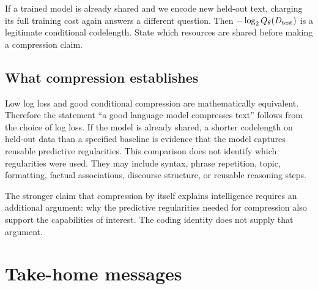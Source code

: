 \documentclass[11pt,twoside]{article}
\theoremstyle{definition}
\theoremstyle{remark}
\begin{document}
If a trained model is already shared and we encode new held-out text, charging
its full training cost again answers a different question. Then
$-\log_2Q_\theta(D_{\rm test})$ is a legitimate conditional codelength. State
which resources are shared before making a compression claim.

\subsection{What compression establishes}

Low log loss and good conditional compression are mathematically equivalent.
Therefore the statement ``a good language model compresses text'' follows from
the choice of log loss. If the model is already shared, a shorter codelength on
held-out data than a specified baseline is evidence that the model captures
reusable predictive regularities. This comparison does not identify which
regularities were used. They may include syntax, phrase repetition, topic,
formatting, factual associations, discourse structure, or reusable reasoning
steps.

The stronger claim that compression by itself explains intelligence requires
an additional argument: why the predictive regularities needed for compression
also support the capabilities of interest. The coding identity does not supply
that argument.


\section{Take-home messages}
\label{sec:take-home}
\end{document}
